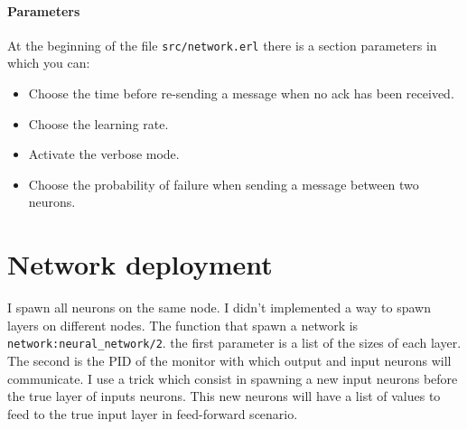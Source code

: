\documentclass[12pt]{article}
\begin{document}
\paragraph{Parameters}
At the beginning of the file \verb|src/network.erl| there is a section parameters in which you can:
\begin{itemize}
	\item Choose the time before re-sending a message when no ack has been received.
	\item Choose the learning rate.
	\item Activate the verbose mode.
	\item Choose the probability of failure when sending a message between two neurons.
\end{itemize}

\section{Network deployment}

I spawn all neurons on the same node. I didn't implemented a way to spawn layers on different nodes. The function that spawn a network is \verb|network:neural_network/2|. the first parameter is a list of the sizes of each layer. The second is the PID of the monitor with which output and input neurons will communicate. I use a trick which consist in spawning a new input neurons before the true layer of inputs neurons. This new neurons will have a list of values to feed to the true input layer in feed-forward scenario.
\end{document}
